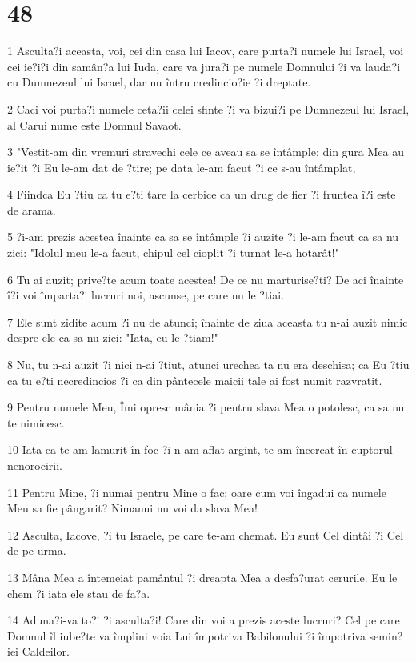 \chapter{48}

\par 1 Asculta?i aceasta, voi, cei din casa lui Iacov, care purta?i numele lui Israel, voi cei ie?i?i din samân?a lui Iuda, care va jura?i pe numele Domnului ?i va lauda?i cu Dumnezeul lui Israel, dar nu întru credincio?ie ?i dreptate.
\par 2 Caci voi purta?i numele ceta?ii celei sfinte ?i va bizui?i pe Dumnezeul lui Israel, al Carui nume este Domnul Savaot.
\par 3 "Vestit-am din vremuri stravechi cele ce aveau sa se întâmple; din gura Mea au ie?it ?i Eu le-am dat de ?tire; pe data le-am facut ?i ce s-au întâmplat,
\par 4 Fiindca Eu ?tiu ca tu e?ti tare la cerbice ca un drug de fier ?i fruntea î?i este de arama.
\par 5 ?i-am prezis acestea înainte ca sa se întâmple ?i auzite ?i le-am facut ca sa nu zici: "Idolul meu le-a facut, chipul cel cioplit ?i turnat le-a hotarât!"
\par 6 Tu ai auzit; prive?te acum toate acestea! De ce nu marturise?ti? De aci înainte î?i voi împarta?i lucruri noi, ascunse, pe care nu le ?tiai.
\par 7 Ele sunt zidite acum ?i nu de atunci; înainte de ziua aceasta tu n-ai auzit nimic despre ele ca sa nu zici: "Iata, eu le ?tiam!"
\par 8 Nu, tu n-ai auzit ?i nici n-ai ?tiut, atunci urechea ta nu era deschisa; ca Eu ?tiu ca tu e?ti necredincios ?i ca din pântecele maicii tale ai fost numit razvratit.
\par 9 Pentru numele Meu, Îmi opresc mânia ?i pentru slava Mea o potolesc, ca sa nu te nimicesc.
\par 10 Iata ca te-am lamurit în foc ?i n-am aflat argint, te-am încercat în cuptorul nenorocirii.
\par 11 Pentru Mine, ?i numai pentru Mine o fac; oare cum voi îngadui ca numele Meu sa fie pângarit? Nimanui nu voi da slava Mea!
\par 12 Asculta, Iacove, ?i tu Israele, pe care te-am chemat. Eu sunt Cel dintâi ?i Cel de pe urma.
\par 13 Mâna Mea a întemeiat pamântul ?i dreapta Mea a desfa?urat cerurile. Eu le chem ?i iata ele stau de fa?a.
\par 14 Aduna?i-va to?i ?i asculta?i! Care din voi a prezis aceste lucruri? Cel pe care Domnul îl iube?te va împlini voia Lui împotriva Babilonului ?i împotriva semin?iei Caldeilor.
